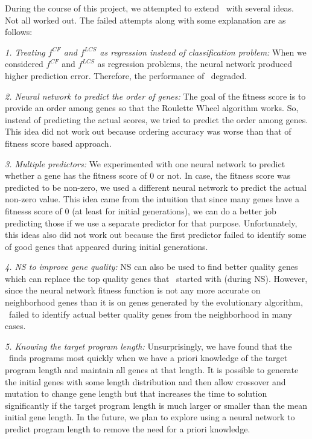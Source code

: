 During the course of this project, we attempted to extend \scheme\ with several ideas. 
Not all worked out. The failed attempts along with some explanation 
are as follows: 

    {\em 1. Treating $f^{CF}$ and $f^{LCS}$ as regression instead of classification 
    problem:} When we considered $f^{CF}$ and $f^{LCS}$ as regression problems, the neural
    network produced higher prediction error. 
    Therefore, the performance of \scheme\ degraded.

    {\em 2. Neural network to predict the order of genes:} The goal of the fitness 
    score is to provide an order among genes so that the Roulette Wheel algorithm works. So, 
    instead of predicting the actual scores, we tried to predict the order among genes. This 
    idea did not work out because ordering accuracy was worse than that of 
    fitness score based approach.
    
    {\em 3. Multiple predictors:} We experimented with one neural network 
    to predict whether 
    a gene has the fitness score of 0 or not. In case, the fitness score was predicted to be non-zero, we used a different neural network to predict the actual non-zero value. This idea came from the intuition that since many genes have a fitnesss score of 0 (at least for initial generations), we can do a better job predicting those if we use a separate predictor for that purpose. Unfortunately, this ideas also did not work out because the first predictor failed to identify some of good genes that appeared during initial generations.
    
    {\em 4. NS to improve gene quality:} NS can also be used to find better quality genes which can replace the top quality genes that \scheme\ started with (during NS).
    However, since the neural network fitness function is not any more accurate on neighborhood genes than it is on genes generated by the evolutionary algorithm, \scheme\ failed to identify actual better quality genes from the neighborhood in many cases. %

    {\em 5. Knowing the target program length:} Unsurprisingly, we have found that the \scheme\ finds programs most quickly when we have a priori knowledge of the target program length and maintain all genes at that length.  It is possible to generate the initial genes with some length distribution %
    and then allow crossover and mutation to change gene length but that increases the time to solution significantly if the target program length is much larger or smaller than the mean initial gene length.  In the future, we plan to explore using a neural network to predict program length to remove the need for a priori knowledge.
    
